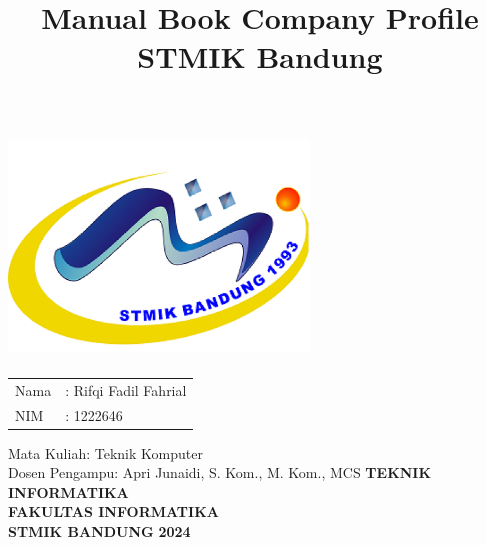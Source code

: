 \documentclass[a4paper,12 pt]{article}
\title{\textbf{Manual Book }\linebreak 
\textbf{Company Profile STMIK Bandung}\linebreak}
\date{}
\begin{document}
\maketitle
\thispagestyle{empty}
\begin{center}
\includegraphics[width=8cm,height=6cm]{logo}
\end{center}


\vspace{0.5 cm}
\begin{center}
\begin{tabular}{ll}
Nama & : Rifqi Fadil Fahrial \\
NIM & : 1222646\\
\end{tabular}
\newline
\newline
\newline
Mata Kuliah: Teknik Komputer \\
Dosen Pengampu: Apri Junaidi, S. Kom., M. Kom., MCS \linebreak
\newline
\newline
\textbf {TEKNIK INFORMATIKA} \\
\textbf {FAKULTAS INFORMATIKA} \\
\textbf {STMIK BANDUNG}
\linebreak
\textbf {2024} \linebreak
\end{center}

\pagebreak
\end{document}
